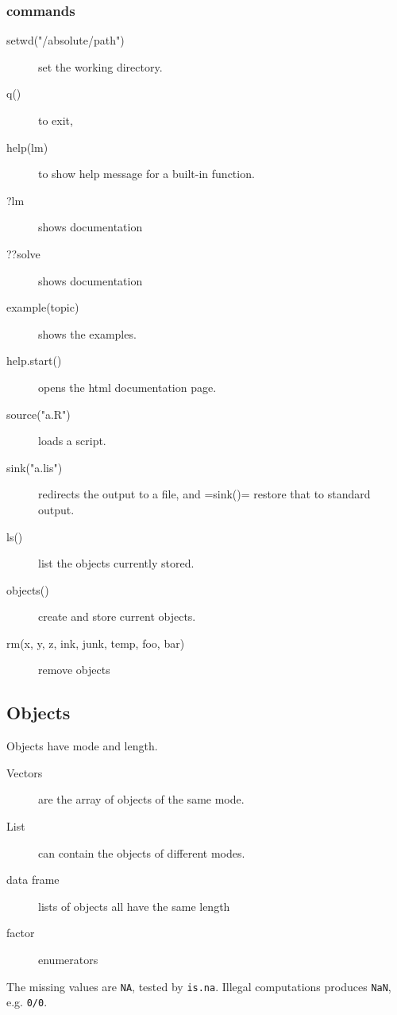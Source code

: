 \subsubsection{commands}
\begin{description}
\item [setwd("/absolute/path")] set the working directory.
\item [q()] to exit, 
\item [help(lm)] to show help message for a built-in function.
\item [?lm] shows documentation
\item [??solve] shows documentation
\item [example(topic)] shows the examples.
\item [help.start()] opens the html documentation page.
\item [source("a.R")] loads a script.
\item [sink("a.lis")] redirects the output to a file, and =sink()=
  restore that to standard output.
\item [ls()] list the objects currently stored.
\item [objects()] create and store current objects.
\item [rm(x, y, z, ink, junk, temp, foo, bar)] remove objects
\end{description}

\subsection{Objects}
Objects have mode and length.
\begin{description}
\item [Vectors] are the array of objects of the same mode.
\item [List] can contain the objects of different modes.
\item [data frame] lists of objects all have the same length
\item [factor] enumerators
\end{description}

The missing values are \texttt{NA}, tested by \texttt{is.na}.  Illegal
computations produces \texttt{NaN}, e.g. \texttt{0/0}.

